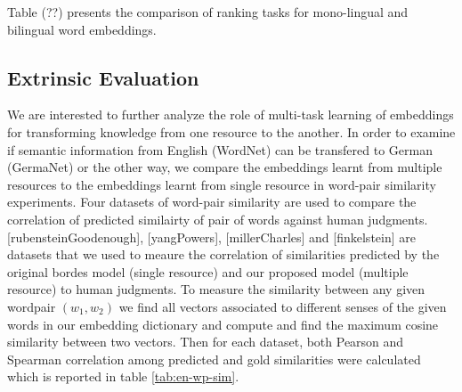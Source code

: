 \documentclass[11pt]{article}
\begin{document}
  Table (??) presents
 the comparison of ranking tasks for mono-lingual and bilingual word embeddings.
     
 \FloatBarrier  

\subsection{Extrinsic Evaluation}
\label{ssec:extrinsic}
 \label{exp:word-similarity}
 We are interested to further analyze the role of multi-task learning of embeddings for transforming knowledge
 from one resource to the another. In order to examine
 if semantic information from English (WordNet) can be transfered to German (GermaNet) or the other way,
 we compare the embeddings learnt from multiple resources to the embeddings learnt from single resource in word-pair similarity experiments.
 Four datasets of word-pair similarity are used to compare the correlation of predicted similairty of pair of words against human judgments.
 [rubensteinGoodenough], [yangPowers], [millerCharles] and [finkelstein] are datasets that we used to meaure the correlation of similarities
 predicted by the original bordes model (single resource) and our proposed model (multiple resource) to human judgments.
 To measure the similarity between any given wordpair $(w_1 , w_2)$ we find all vectors associated to different senses
 of the given words in our embedding dictionary and compute and find the maximum cosine similarity between two vectors.
 Then for each dataset, both Pearson and Spearman correlation among predicted and gold similarities 
 were calculated which is reported in table \ref{tab:en-wp-sim}. 
 
\end{document}
